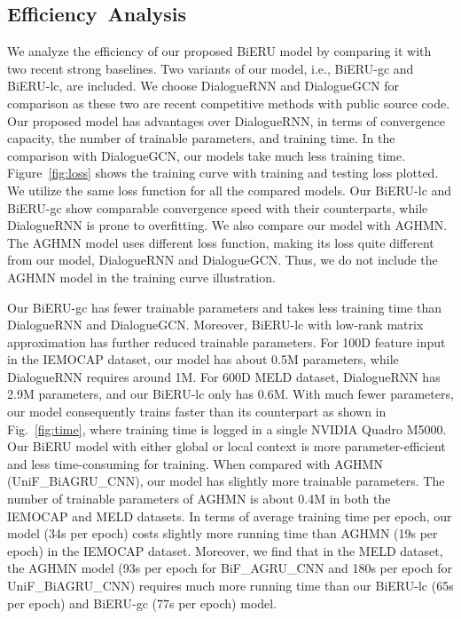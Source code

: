 \documentclass[journal]{IEEEtran}
\begin{document}
\subsection{Efficiency~Analysis}
We analyze the efficiency of our proposed BiERU model by comparing it with two recent strong baselines. 
Two variants of our model, i.e., BiERU-gc and BiERU-lc, are included.
We choose DialogueRNN and DialogueGCN for comparison as these two are recent competitive methods with public source code. 
Our proposed model has advantages over DialogueRNN, in terms of convergence capacity, the number of trainable parameters, and training time.
In the comparison with DialogueGCN, our models take much less training time. 
Figure~\ref{fig:loss} shows the training curve with training and testing loss plotted. We utilize the same loss function for all the compared models.
Our BiERU-lc and BiERU-gc show comparable convergence speed with their counterparts, while DialogueRNN is prone to overfitting. 
{We also compare our model with AGHMN. The AGHMN model uses different loss function, making its loss quite different from our model, DialogueRNN and DialogueGCN. Thus, we do not include the AGHMN model in the training curve illustration.
}


{Our BiERU-gc has fewer trainable parameters and takes less training time than DialogueRNN and DialogueGCN.}
Moreover, BiERU-lc with low-rank matrix approximation has further reduced trainable parameters.
For 100D feature input in the IEMOCAP dataset, our model has about 0.5M parameters, while DialogueRNN requires around 1M. 
For 600D MELD dataset, DialogueRNN has 2.9M parameters, and our BiERU-lc only has 0.6M. 
With much fewer parameters, our model consequently trains faster than its counterpart as shown in Fig.~\ref{fig:time}, where training time is logged in a single NVIDIA Quadro M5000. 
Our BiERU model with either global or local context is more parameter-efficient and less time-consuming for training.
{When compared with AGHMN (UniF\_BiAGRU\_CNN), our model has slightly more trainable parameters. The number of trainable parameters of AGHMN is about 0.4M in both the IEMOCAP and MELD datasets. 
In terms of average training time per epoch, our model (34s per epoch) costs slightly more running time than AGHMN (19s per epoch) in the IEMOCAP dataset.
Moreover, we find that in the MELD dataset, the AGHMN model (93s per epoch for BiF\_AGRU\_CNN and 180s per epoch for UniF\_BiAGRU\_CNN) requires much more running time than our BiERU-lc (65s per epoch) and BiERU-gc (77s per epoch) model.} 
\end{document}
